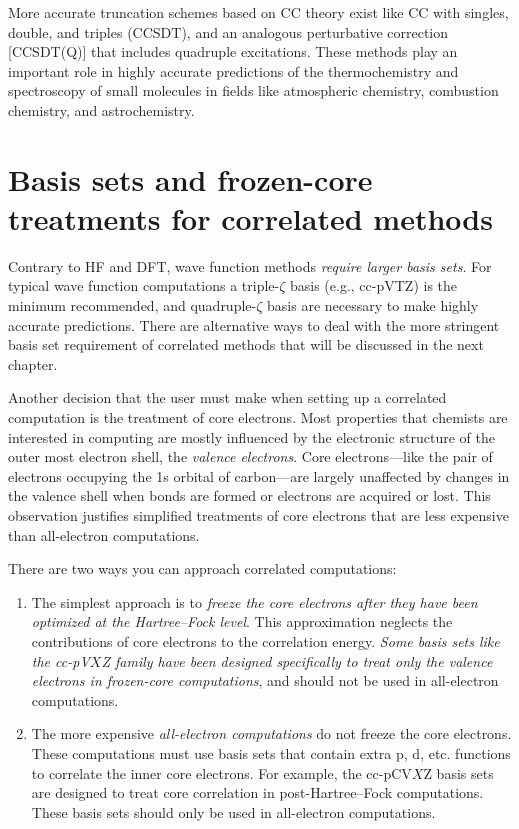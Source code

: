 \documentclass[../Main/notes.tex]{subfiles}
\begin{document}
More accurate truncation schemes based on CC theory exist like CC with singles, double, and triples (CCSDT), and an analogous perturbative correction [CCSDT(Q)] that includes quadruple excitations.
These methods play an important role in highly accurate predictions of  the thermochemistry and spectroscopy of small molecules in fields like atmospheric chemistry, combustion chemistry, and astrochemistry.

\section{Basis sets and frozen-core treatments for correlated methods}

Contrary to HF and DFT, wave function methods \emph{require larger basis sets}.
For typical wave function computations a triple-$\zeta$ basis (e.g., cc-pVTZ) is the minimum recommended, and quadruple-$\zeta$ basis are necessary to make highly accurate predictions.
There are alternative ways to deal with the more stringent basis set requirement of correlated methods that will be discussed in the next chapter.

Another decision that the user must make when setting up a correlated computation is the treatment of core electrons.
Most properties that chemists are interested in computing are mostly influenced by the electronic structure of the outer most electron shell, the \emph{valence electrons}.
Core electrons---like the pair of electrons occupying the 1s orbital of carbon---are largely unaffected by changes in the valence shell when bonds are formed or electrons are acquired or lost.
This observation justifies simplified treatments of core electrons that are less expensive than all-electron computations.

There are two ways you can approach correlated computations:
\begin{enumerate}
\item The simplest approach is to \emph{freeze the core electrons after they have been optimized at the Hartree--Fock level}.
This approximation neglects the contributions of core electrons to the correlation energy.
\emph{Some basis sets like the cc-pV$X$Z family have been designed specifically to treat only the valence electrons in frozen-core computations}, and should not be used in all-electron computations.

\item The more expensive \emph{all-electron computations} do not freeze the core electrons.
These computations must use basis sets that contain extra p, d, etc. functions to correlate the inner core electrons.
For example, the cc-pCV$X$Z basis sets are designed to treat core correlation in post-Hartree--Fock computations.
These basis sets should only be used in all-electron computations.
\end{enumerate}
\end{document}
